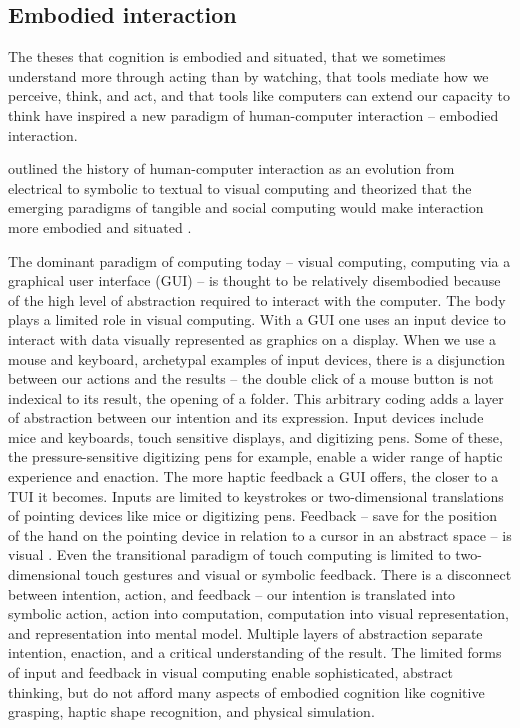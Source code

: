 \documentclass{article}
\begin{document}

\subsection{Embodied interaction}
The theses
that cognition is embodied and situated,
that we sometimes understand more through acting than by watching,
that tools mediate how we perceive, think, and act, 
and that tools like computers can extend our capacity to think \citep{Kirsh2013}
have inspired a new paradigm of human-computer interaction -- embodied interaction.  

\citeauthor{Dourish2001} 
outlined the history of human-computer interaction as an evolution from electrical to symbolic to textual to visual computing 
and theorized that the emerging paradigms of tangible and social computing would 
make interaction more embodied and situated \citeyearpar{Dourish2001}.

The dominant paradigm of computing today -- visual computing, computing via a graphical user interface (GUI) -- 
is thought to be relatively disembodied because of the high level of abstraction required to interact with the computer. 
The body plays a limited role in visual computing. 
With a GUI one uses an input device to interact with data visually represented as graphics on a display. 
When we use a mouse and keyboard, archetypal examples of input devices, there is a disjunction between our actions and the results -- the double click of a mouse button is not indexical to its result, the opening of a folder. This arbitrary coding adds a layer of abstraction between our intention and its expression. 
Input devices include mice and keyboards, touch sensitive displays, and digitizing pens. Some of these, the pressure-sensitive digitizing pens for example, enable a wider range of haptic experience and enaction. The more haptic feedback a GUI offers, the closer to a TUI it becomes.
Inputs are limited to keystrokes or two-dimensional translations of pointing devices like mice or digitizing pens.
Feedback -- save for the position of the hand on the pointing device in relation to a cursor in an abstract space -- is visual 
\citep{Dourish2001,Ishii2008}. 
Even the transitional paradigm of touch computing is limited to two-dimensional touch gestures and visual or symbolic feedback. 
There is a disconnect between intention, action, and feedback -- 
our intention is translated into symbolic action, action into computation, computation into visual representation, and representation into mental model. 
Multiple layers of abstraction separate intention, enaction, and a critical understanding of the result. 
The limited forms of input and feedback in visual computing 
enable sophisticated, abstract thinking, but do not afford many aspects of embodied cognition like cognitive grasping, haptic shape recognition, and physical simulation. 
\end{document}
